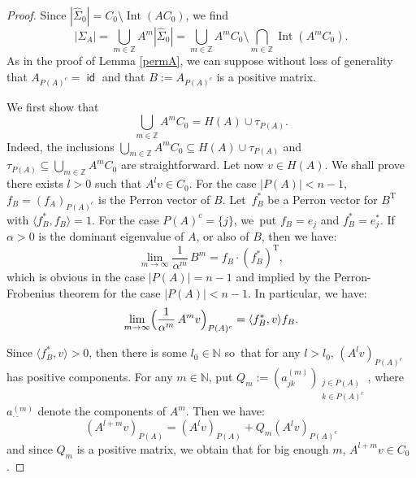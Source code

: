 \documentclass[JEP,XML,SOM,Unicode,NoFloatCountersInSection]{cedram}
\theoremstyle{definition}
\let\al\alpha
\let\sminus\setminus
\newcommand{\NN}{\mathbb{N}}
\newcommand{\ZZ}{\mathbb{Z}}
\DeclareMathOperator{\id}{\mathsf{id}}
\DeclareMathOperator{\Int}{Int}
\newcommand{\transp}[1]{{#1}^{\scriptscriptstyle\mathrm{T}}}
\begin{document}
\begin{proof}
Since $|\hat{\Sigma}_0|=C_0\sminus\Int(AC_0)$, we find
\begin{equation*}
|\Sigma_A|=\bigcup_{m\in\ZZ}A^m|\hat{\Sigma}_0|=\bigcup_{m\in\ZZ}A^mC_0\sminus\bigcap_{m\in\ZZ}\Int(A^{m}C_0).
\end{equation*}
As in the proof of Lemma \ref{permA}, we can suppose without loss of generality that $A_{P(A)^c} =\id$ and that $B:=A_{P(A)^c}$ is a positive matrix.

We first show that
\begin{equation}\label{eqn:unionfans}
\bigcup_{m\in\ZZ}A^mC_0=H(A)\cup\tau_{P(A)}.
\end{equation}
Indeed, the inclusions $\bigcup_{m\in \mathbb{Z}} A^mC_0\subseteq H(A) \cup \tau_{P(A)}$ and $\tau_{P(A)} \subseteq \bigcup_{m\in \mathbb{Z}} A^mC_0$ are straightforward. Let now $v \in H(A)$. We shall prove there exists $l>0$ such that $A^lv \in C_0$. For the case $|P(A)|<n-1$, $f_B=(f_A)_{P(A)^c}$ is the Perron vector of $B$. Let~$f_B^*$ be a Perron vector for $\transp{B}$ with $\langle f_B^*,f_B\rangle=1$. For the case $P(A)^c=\{j\}$, we~put $f_B=e_j$ and $f^*_B=e_j^*$. If $\al>0$ is the dominant eigenvalue of $A$, or also of $B$, then we have:
\begin{equation}\label{limB}
\lim_{m \to \infty}\frac{1}{\alpha^{m}}\,B^m=f_B \cdot \transp{(f^*_B)},
\end{equation}
which is obvious in the case $|P(A)|=n-1$ and implied by the Perron-Frobenius theorem for the case $|P(A)|<n-1$. In particular, we have:
\begin{equation*}
\lim_{m \to \infty} \Bigl( \frac{1}{\al^m}\,A^mv\Bigr)_{P(A)^c}=\langle f_B^*, v\rangle f_B.
\end{equation*}

Since $\langle f_B^*,v\rangle> 0$, then there is some $l_0\in\NN$ so~that for any $l > l_0$, $(A^lv)_{P(A)^c}$ has positive components. For any $m\in\NN$, put $Q_m:=(a^{(m)}_{jk})_{\substack{j\in P(A)\\ k\in P(A)^c}}$, where $a^{(m)}_{\cdot\cdot}$ denote the components of $A^m$. Then we have:
\begin{equation*}
(A^{l+m}v)_{P(A)} =(A^lv)_{P(A)}+ Q_m(A^lv)_{P(A)^c}
\end{equation*}
and since $Q_m$ is a positive matrix, we obtain that for big enough $m$, $A^{l+m}v\in C_0$.


\end{proof}
\end{document}
